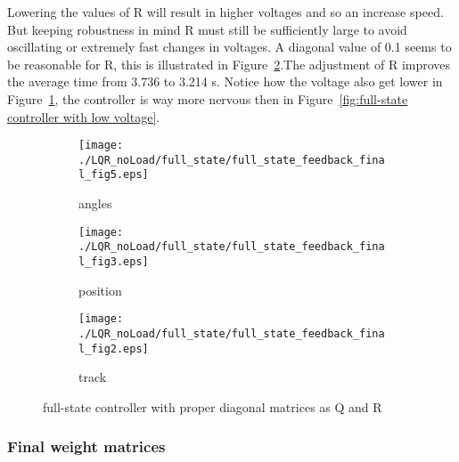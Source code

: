 Lowering the values of R  will result in higher voltages and so an increase speed. But keeping robustness in mind R must still be sufficiently large to avoid oscillating or extremely fast changes in voltages. A diagonal value of 0.1 seems to be reasonable for R, this is illustrated in Figure~\ref{fig:full-state controller with proper diagonal matrices as Q and R}.The adjustment of R improves the average time from 3.736 to 3.214 s. Notice how the voltage also get lower in Figure~\ref{fig:full-state controller with proper diagonal matrices as Q and R - voltages}, the controller is way more nervous then in Figure~\ref{fig:full-state controller with low voltage}.
\begin{figure}[H]
	\centering
	\begin{subfigure}[b]{0.3\textwidth}
		\texttt{[image: ./LQR\_noLoad/full\_state/full\_state\_feedback\_final\_fig5.eps]}
		\caption{angles}
		\label{fig:full-state controller with proper diagonal matrices as Q and R - voltages}
	\end{subfigure}
	\begin{subfigure}[b]{0.3\textwidth}
		\texttt{[image: ./LQR\_noLoad/full\_state/full\_state\_feedback\_final\_fig3.eps]}
		\caption{position}
	\end{subfigure}
	\begin{subfigure}[b]{0.3\textwidth}
		\texttt{[image: ./LQR\_noLoad/full\_state/full\_state\_feedback\_final\_fig2.eps]}
		\caption{track}
	\end{subfigure}
	\caption{full-state controller with proper diagonal matrices as Q and R}\label{fig:full-state controller with proper diagonal matrices as Q and R}
\end{figure}
\subsubsection{Final weight matrices}

